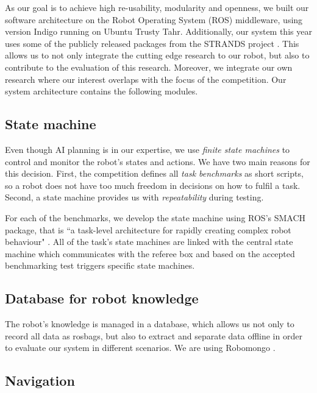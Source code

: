 As our goal is to achieve high re-usability, modularity and openness, we built our software architecture on the Robot Operating System (ROS) middleware, using version Indigo \cite{ros} running on Ubuntu Trusty Tahr. 
Additionally, our system this year uses some of the publicly released packages from the STRANDS project \cite{strands}. 
This allows us to not only integrate the cutting edge research to our robot, but also to contribute to the evaluation of this research. 
Moreover, we integrate our own research where our interest overlaps with the focus of the competition.
Our system architecture contains the following modules.

\subsection{State machine}

Even though AI planning is in our expertise, we use \textit{finite state machines} to control and monitor the robot's states and actions. 
We have two main reasons for this decision. First, the competition defines all \textit{task benchmarks} as short scripts, so a robot does not have too much freedom in decisions on how to fulfil a task. Second, a state machine provides us with \textit{repeatability} during testing.

For each of the benchmarks, we develop the state machine using ROS's SMACH package, that is ``a task-level architecture for rapidly creating complex robot behaviour" \cite{smach}. 
All of the task's state machines are linked with the central state machine which communicates with the referee box and based on the accepted benchmarking test triggers specific state machines. 


\subsection{Database for robot knowledge}

The robot's knowledge is managed in a database, which allows us not only to record all data as rosbags, but also to extract and separate data offline in order to evaluate our system in different scenarios. 
We are using Robomongo \cite{robomongo}.

\subsection{Navigation}

